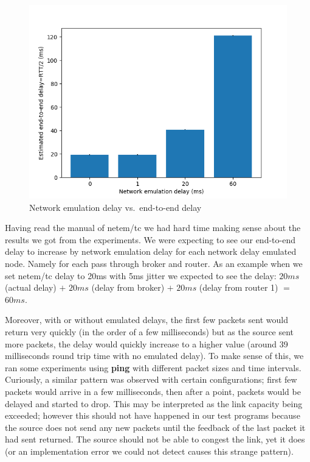 \documentclass[conference]{IEEEtran}
\begin{document}
\begin{figure}
    \centering
    \includegraphics[scale=0.6]{graphics/plt}
    \caption{Network emulation delay vs.\ end-to-end delay}\label{fig:graph}
\end{figure}

Having read the manual of netem/tc we had hard time making sense about the results we got from the experiments. We were expecting to see our end-to-end delay to increase by network emulation delay for each network delay emulated node. Namely for each pass through broker and router. As an example when we set netem/tc delay to 20ms with 5ms jitter we expected to see the delay: $20ms$ (actual delay) $+$ $20ms$ (delay from broker) $+$ $20ms$ (delay from router 1) $=$ $60ms$.

Moreover, with or without emulated delays, the first few packets sent would return
very quickly (in the order of a few milliseconds) but as the source sent more packets,
the delay would quickly increase to a higher value (around 39 milliseconds round trip time with no
emulated delay). To make sense of this, we ran some experiments using \textbf{ping}
with different packet sizes and time intervals. Curiously, a similar pattern was observed
with certain configurations; first few packets would arrive in a few milliseconds, then
after a point, packets would be delayed and started to drop. This may be interpreted
as the link capacity being exceeded; however this should not have happened in our test programs
because the source does not send any new packets until the feedback of the last packet it had sent
returned. The source should not be able to congest the link, yet it does
(or an implementation error we could not detect causes this strange pattern).
\end{document}
